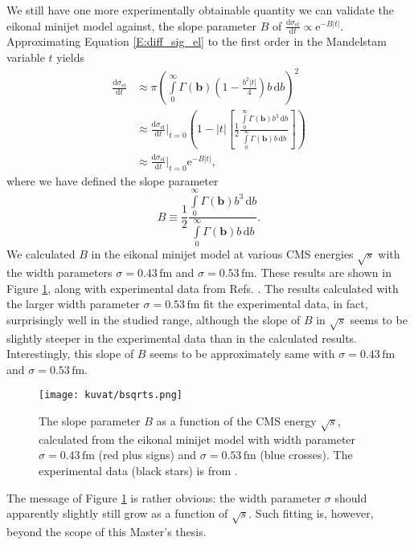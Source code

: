 \documentclass[a4paper, twoside, english, 12pt]{report}
\begin{document}
We still have one more experimentally obtainable quantity we can validate the eikonal minijet model against, the slope parameter $B$ of $\frac{\text{d}\sigma_{\text{el}}}{\text{d}t} \propto \text{e}^{-B|t|}$. Approximating Equation \eqref{E:diff_sig_el} to the first order in the Mandelstam variable $t$ yields
\begin{align}
\frac{\text{d}\sigma_\text{el}}{\text{d}t} &\approx \pi \left(\int\limits_{0}^{\infty}\Gamma(\mathbf{b})\left(1-\frac{b^2|t|}{4}\right)b\,\text{d}b\right)^2 \nonumber\\[0.4em]
&\approx \frac{\text{d}\sigma_\text{el}}{\text{d}t}\bigg\rvert_{t=0}  \left(1-|t|\left[\frac{1}{2}\frac{\int\limits_{0}^{\infty}\Gamma(\mathbf{b})b^3\,\text{d}b}{\int\limits_{0}^{\infty}\Gamma(\mathbf{b})b\,\text{d}b}\right]\right) \nonumber\\[0.4em]
&\approx \frac{\text{d}\sigma_\text{el}}{\text{d}t}\bigg\rvert_{t=0} \text{e}^{-B|t|},
\end{align}
where we have defined the slope parameter
\begin{equation}
B\equiv \frac{1}{2}\frac{\int\limits_{0}^{\infty}\Gamma(\mathbf{b})b^3\,\text{d}b}{\int\limits_{0}^{\infty}\Gamma(\mathbf{b})b\,\text{d}b}.
\end{equation}
We calculated $B$ in the eikonal minijet model at various CMS energies $\sqrt{s}$ with the width parameters $\sigma = 0.43\,\text{fm}$ and $\sigma = 0.53\,\text{fm}$. These results are shown in Figure \ref{F:bsqrts}, along with experimental data from Refs. \cite{totemia,bd1,bd2,bd3,bd4,bd5,bd6,bd7}. The results calculated with the larger width parameter $\sigma = 0.53\,\text{fm}$ fit the experimental data, in fact, surprisingly well in the studied range, although the slope of $B$ in $\sqrt{s}$ seems to be slightly steeper in the experimental data than in the calculated results. Interestingly, this slope of $B$ seems to be approximately same with $\sigma = 0.43\,\text{fm}$ and $\sigma = 0.53\,\text{fm}$.
\begin{figure}[htb!]
	\centering
	\texttt{[image: kuvat/bsqrts.png]}
	\caption{The slope parameter $B$ as a function of the CMS energy $\sqrt{s}$, calculated from the eikonal minijet model with width parameter $\sigma = 0.43\,\text{fm}$ (red plus signs) and $\sigma = 0.53\,\text{fm}$ (blue crosses). The experimental data (black stars) is from  \cite{totemia,bd1,bd2,bd3,bd4,bd5,bd6,bd7}. }
	\label{F:bsqrts}
\end{figure}
The message of Figure \ref{F:bsqrts} is rather obvious: the width parameter $\sigma$ should apparently slightly still grow as a function of $\sqrt{s}$. Such fitting is, however, beyond the scope of this Master's thesis.
\end{document}
